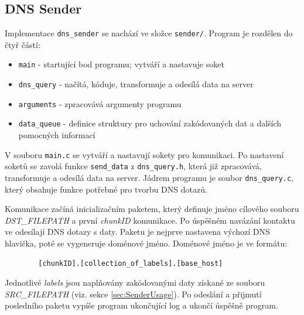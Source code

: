\documentclass[a4paper,11pt]{article}
\begin{document}
    \subsection{DNS Sender}
    Implementace \verb|dns_sender| se nachází ve složce \verb|sender/|. Program je rozdělen do čtyř částí:
    \begin{itemize}
        \setlength\itemsep{1pt}
        \item \verb|main|       \-- startující bod programu; vytváří a nastavuje soket
        \item \verb|dns_query|  \-- načítá, kóduje, transformuje a odesílá data na server
        \item \verb|arguments|  \-- zpracovává argumenty programu
        \item \verb|data_queue| \-- definice struktury pro uchování zakódovaných dat a dalších pomocných informací
    \end{itemize}
    V souboru \verb|main.c| se vytváří a nastavují sokety pro komunikaci. Po nastavení soketů se zavolá funkce
    \verb|send_data| z \verb|dns_query.h|, která již zpracovává, transformuje a odesílá data na server. Jádrem programu
    je soubor \verb|dns_query.c|, který obsahuje funkce potřebné pro tvorbu DNS dotazů.

    Komunikace začíná inicializačním paketem, který definuje jméno cílového souboru \emph{DST\_FILEPATH} a
    první \emph{chunkID} komunikace. Po úspěšném navázání kontaktu ve odesílají DNS dotazy s daty.
    Paketu je nejprve nastavena výchozí DNS hlavička, poté se vygeneruje doménové jméno. Doménové jméno je ve formátu:
    \begin{verbatim}
        [chunkID].[collection_of_labels].[base_host] \end{verbatim}
    Jednotlivé \emph{labels} jsou naplňovány zakódovanými daty získané ze souboru \emph{SRC\_FILEPATH} (viz. sekce \ref{sec:SenderUsage}).
    Po odeslání a přijmutí posledního paketu vypíše program ukončující log a ukončí úspěšně program.
\end{document}
